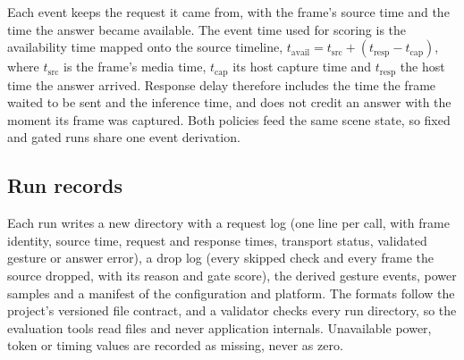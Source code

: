 Each event keeps the request it came from, with the frame's source time and the time the answer became available.
The event time used for scoring is the availability time mapped onto the source timeline,
$t_{\text{avail}} = t_{\text{src}} + (t_{\text{resp}} - t_{\text{cap}})$,
where $t_{\text{src}}$ is the frame's media time, $t_{\text{cap}}$ its host capture time and $t_{\text{resp}}$ the host time the answer arrived.
Response delay therefore includes the time the frame waited to be sent and the inference time, and does not credit an answer with the moment its frame was captured.
Both policies feed the same scene state, so fixed and gated runs share one event derivation.

\subsection{Run records}
\label{sec:records}
Each run writes a new directory with a request log (one line per call, with frame identity, source time, request and response times, transport status, validated gesture or answer error), a drop log (every skipped check and every frame the source dropped, with its reason and gate score), the derived gesture events, power samples and a manifest of the configuration and platform.
The formats follow the project's versioned file contract, and a validator checks every run directory, so the evaluation tools read files and never application internals.
Unavailable power, token or timing values are recorded as missing, never as zero.

